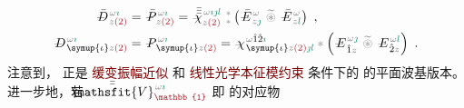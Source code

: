 \begin{subequations} \label{eq:DP^(2)-plane_wave_basis-p_pp}
\begin{align}
	\Xint{\mathcolor{gray}{-}}{30}{\bar{D}}^{\;\! \mathcolor{gray}{\omega} \textcolor{PineGreen}{\imath}}_{\;\! \mathcolor{gray}{z} \textcolor{Maroon}{(2)}} &= \Xint{\mathcolor{gray}{-}}{30}{\bar{P}}^{\;\! \mathcolor{gray}{\omega} \textcolor{PineGreen}{\imath}}_{\;\! \mathcolor{gray}{z} \textcolor{Maroon}{(2)}} = \Xint{{}^{}_{\mathcolor{gray}{-}}}{23}{\bar{\bar{\bar{\chi}}}}^{\;\! \mathcolor{gray}{\omega} \textcolor{PineGreen}{\imath \jmath l}}_{\mathcolor{gray}{z} \textcolor{Maroon}{(2)}} ~{}^{\mathcolor{gray}{*}}_{\mathcolor{gray}{*}} \left( \Xint{\mathcolor{gray}{-}}{295}{\bar{E}}^{\;\!\mathcolor{gray}{\omega}}_{\;\! \mathcolor{gray}{z} \textcolor{PineGreen}{\jmath} } ~\mathcolor{gray}{\widetilde \circledast}~ \Xint{\mathcolor{gray}{-}}{295}{\bar{E}}^{\;\!\mathcolor{gray}{\omega}}_{\;\! \mathcolor{gray}{z} \textcolor{PineGreen}{l} } \right) ~, \label{eq:vec-DP^(2)-plane_wave_basis-p_pp} \\
	\Xint{\mathcolor{gray}{-}}{30}{D}^{\;\! \mathcolor{gray}{\omega} \textcolor{PineGreen}{\imath}}_{\;\! \symup{\iota}\mathcolor{gray}{z} \textcolor{Maroon}{(2)}} &= \Xint{\mathcolor{gray}{-}}{30}{P}^{\;\! \mathcolor{gray}{\omega} \textcolor{PineGreen}{\imath}}_{\;\! \symup{\iota}\mathcolor{gray}{z} \textcolor{Maroon}{(2)}} = \Xint{{}^{}_{\mathcolor{gray}{-}}}{23}{\chi}^{\;\! \mathcolor{gray}{\omega} \hat{1} \hat{2} \textcolor{PineGreen}{\imath}}_{\;\! \symup{\iota} \mathcolor{gray}{z} \textcolor{Maroon}{(2)} \textcolor{PineGreen}{\jmath l}} \mathcolor{gray}{*} \left( \Xint{\mathcolor{gray}{-}}{295}{E}^{\;\!\mathcolor{gray}{\omega} \textcolor{PineGreen}{\jmath}}_{\;\! \hat{1} \mathcolor{gray}{z}} ~\mathcolor{gray}{\widetilde \circledast}~ \Xint{\mathcolor{gray}{-}}{295}{E}^{\;\!\mathcolor{gray}{\omega} \textcolor{PineGreen}{l}}_{\;\! \hat{2} \mathcolor{gray}{z}} \right) ~. \label{eq:components-DP^(2)-plane_wave_basis-p_pp}
\end{align}
\end{subequations}
注意到， 正是 \textcolor{Maroon}{缓变振幅近似} 和 \textcolor{Maroon}{线性光学本征模约束}  条件下的  的\textcolor{PineGreen}{平面波基}版本。进一步地，若 $\Xint{\mathcolor{gray}{-}}{25}{\bar{\bar{\mathsfit{V}}}}^{\;\! \mathcolor{gray}{\omega} \textcolor{PineGreen}{\imath}}_{\textcolor{Maroon}{\mathbb{1}}}$ 
即  的对应物
